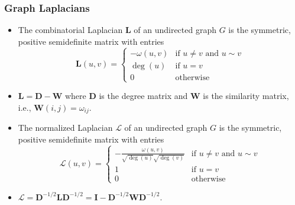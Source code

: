 \documentclass[professionalfonts, hyperref={pdfpagelabels=false,
  colorlinks=true, linkcolor=purple}]{beamer}
\begin{document}
\begin{frame}[label=laplacians]
  \frametitle{Graph Laplacians}
  \begin{itemize}
  \item The \alert{combinatorial Laplacian} $\bm{L}$ of an undirected graph
    $G$ is the symmetric, positive semidefinite matrix with entries
    \begin{equation}
      \label{eq:33}
      \bm{L}(u,v) = \begin{cases}
        - \omega(u,v) & \text{if $u \not = v$ and $u \sim v$} \\
        \deg(u) & \text{if $u = v$} \\
        0 & \text{otherwise}
      \end{cases}
    \end{equation}
  \item $\bm{L} = \bm{D} - \bm{W}$ where $\bm{D}$ is the degree matrix
    and $\bm{W}$ is the similarity matrix, i.e., $\bm{W}(i,j) =
    \omega_{ij}$. 
  \item The \alert{normalized Laplacian} $\bm{\mathcal{L}}$ of an
    undirected graph $G$ is the symmetric, positive semidefinite
    matrix with entries
    \begin{equation}
      \bm{\mathcal{L}}(u,v) = \begin{cases}
        - \tfrac{\omega(u,v)}{\sqrt{\deg(u)}\sqrt{\deg(v)}} & 
        \text{if $u \not = v$ and $u \sim v$} \\
        1 & \text{if $u = v$} \\
        0 & \text{otherwise}
      \end{cases}
    \end{equation}
  \item $\bm{\mathcal{L}} = \bm{D}^{-1/2} \bm{L} \bm{D}^{-1/2} = \bm{I} -
    \bm{D}^{-1/2}\bm{W}\bm{D}^{-1/2}$.  
  \end{itemize}
\end{frame}
\end{document}
